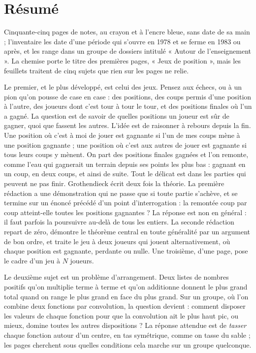 \documentclass[11pt,a4paper]{article}
\begin{document}
\section*{Résumé}

\begin{resume}
Cinquante-cinq pages de notes, au crayon et à l'encre bleue, sans date de
sa main ; l'inventaire les date d'une période qui s'ouvre en 1978 et se ferme
en 1983 ou après, et les range dans un groupe de dossiers intitulé « Autour
de l'enseignement ». La chemise porte le titre
des premières pages, « Jeux de position », mais les feuillets traitent de cinq
sujets que rien sur les pages ne relie.

Le premier, et le plus développé, est celui des jeux. Pensez aux échecs, ou à
un pion qu'on pousse de case en case : des positions, des coups permis d'une
position à l'autre, des joueurs dont c'est tour à tour le tour, et des
positions finales où l'un a gagné. La question est de savoir de quelles
positions un joueur est sûr de gagner, quoi que fassent les autres. L'idée est
de raisonner à rebours depuis la fin. Une position où c'est à moi de jouer est
gagnante si l'un de mes coups mène à une position gagnante ; une position où
c'est aux autres de jouer est gagnante si tous leurs coups y mènent. On part
des positions finales gagnées et l'on remonte, comme l'eau qui gagnerait un
terrain depuis ses points les plus bas : gagnant en un coup, en deux coups, et
ainsi de suite. Tout le délicat est dans les parties qui peuvent ne pas
finir. Grothendieck écrit deux fois la théorie. La première rédaction a une
démonstration qui ne passe que si toute partie s'achève, et se termine sur un
énoncé précédé d'un point d'interrogation : la remontée coup par coup
atteint-elle toutes les positions gagnantes ? La réponse est non en général :
il faut parfois la poursuivre au-delà de tous les entiers. La seconde
rédaction repart de zéro, démontre le théorème central en toute généralité par
un argument de bon ordre, et traite le jeu à deux joueurs qui jouent
alternativement, où chaque position est gagnante, perdante ou nulle. Une
troisième, d'une page, pose le cadre d'un jeu à $N$ joueurs.

Le deuxième sujet est un problème d'arrangement. Deux listes de nombres
positifs qu'on multiplie terme à terme et qu'on additionne donnent le plus
grand total quand on range le plus grand en face du plus grand. Sur un groupe,
où l'on combine deux fonctions par convolution, la question devient : comment
disposer les valeurs de chaque fonction pour que la convolution ait le plus
haut pic, ou mieux, domine toutes les autres dispositions ? La réponse
attendue est de \emph{tasser} chaque fonction autour d'un centre, en tas
symétrique, comme on tasse du sable ; les pages cherchent sous quelles
conditions cela marche sur un groupe quelconque.


\end{resume}
\end{document}
